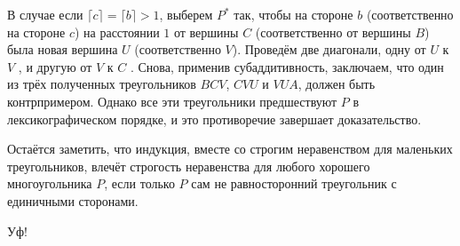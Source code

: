 В случае если $\lceil c\rceil=\lceil b\rceil>1$, выберем $P^*$ так, чтобы на стороне $b$ (соответственно на стороне $c$) на расстоянии $1$ от вершины $C$ (соответственно от вершины $B$) была новая вершина $U$ (соответственно $V$).
Проведём две диагонали, одну от $U$ к $V$%
, и другую от $V$ к $C$%
.
Снова, применив субаддитивность, заключаем, что один из трёх полученных треугольников $BCV$, $CVU$ и $VUA$, должен быть контрпримером.
Однако все эти треугольники предшествуют $P$ в лексикографическом порядке, и это противоречие завершает доказательство.

Остаётся заметить, что индукция, вместе со строгим неравенством для маленьких треугольников, влечёт строгость неравенства для любого хорошего многоугольника $P$, если только $P$ сам не равносторонний треугольник с единичными сторонами.

Уф!
